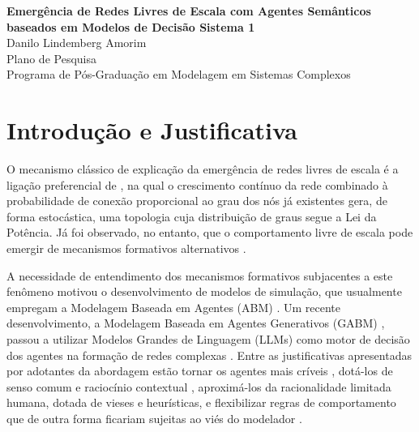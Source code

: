 \documentclass[12pt,oneside,a4paper,brazil,sumario=tradicional]{abntex2}
\begin{document}
\frenchspacing
\textual
\markboth{}{}

\begin{center}
{\Large\bfseries Emergência de Redes Livres de Escala com Agentes Semânticos baseados em Modelos de Decisão Sistema 1}\\[2ex]
{\large Danilo Lindemberg Amorim}\\[1ex]
{\normalsize Plano de Pesquisa\\
Programa de Pós-Graduação em Modelagem em Sistemas Complexos}
\end{center}

\section{Introdução e Justificativa}

O mecanismo clássico de explicação da emergência de redes livres de escala é a ligação preferencial de \textcite{barabasi1999}, na qual o crescimento contínuo da rede combinado à probabilidade de conexão proporcional ao grau dos nós já existentes gera, de forma estocástica, uma topologia cuja distribuição de graus segue a Lei da Potência. Já foi observado, no entanto, que o comportamento livre de escala pode emergir de mecanismos formativos alternativos \parencite{caldarelli2002, vasquez2003, ferrericancho2003, dsouza2007, papadopoulos2012}.

A necessidade de entendimento dos mecanismos formativos subjacentes a este fenômeno motivou o desenvolvimento de modelos de simulação, que usualmente empregam a Modelagem Baseada em Agentes (ABM) \parencite{epstein1999, namatame2016, skyrms2000, zimmermann2005}. Um recente desenvolvimento, a Modelagem Baseada em Agentes Generativos (GABM) \parencite{ghaffarzadegan2024}, passou a utilizar Modelos Grandes de Linguagem (LLMs) como motor de decisão dos agentes na formação de redes complexas \parencite{demarzo2023, piao2025, papachristou2025, ji2025, ji2025b}. Entre as justificativas apresentadas por adotantes da abordagem estão tornar os agentes mais críveis \parencite{park2023, adornetto2025}, dotá-los de senso comum e raciocínio contextual \parencite{vezhnevets2023}, aproximá-los da racionalidade limitada humana, dotada de vieses e heurísticas, e flexibilizar regras de comportamento que de outra forma ficariam sujeitas ao viés do modelador \parencite{lu2024, chopra2024, larooij2025}.
\end{document}
